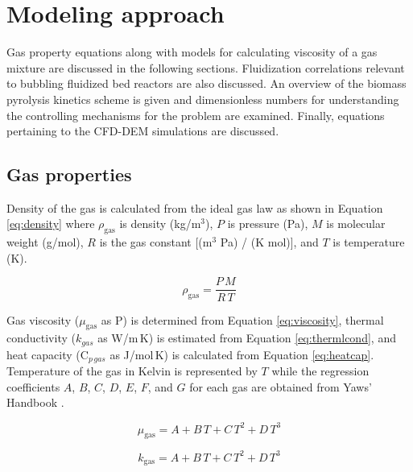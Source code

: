 
\section{Modeling approach}

Gas property equations along with models for calculating viscosity of a gas mixture are discussed in the following sections. Fluidization correlations relevant to bubbling fluidized bed reactors are also discussed. An overview of the biomass pyrolysis kinetics scheme is given and dimensionless numbers for understanding the controlling mechanisms for the problem are examined. Finally, equations pertaining to the CFD-DEM simulations are discussed.


\subsection{Gas properties}

Density of the gas is calculated from the ideal gas law as shown in Equation \ref{eq:density} where $\rho_\text{gas}$ is density (kg/m$^3$), $P$ is pressure (Pa), $M$ is molecular weight (g/mol), $R$ is the gas constant [(m$^3$ Pa) / (K mol)], and $T$ is temperature (K).

\begin{equation}\label{eq:density}
    \rho_\text{gas} = \frac{P\,M}{R\,T}
\end{equation}

Gas viscosity ($\mu_\text{gas}$ as \textmugreek P) is determined from Equation \ref{eq:viscosity}, thermal conductivity ($k_{gas}$ as W/m\,K) is estimated from Equation \ref{eq:thermlcond}, and heat capacity (C$_{p\,gas}$ as J/mol\,K) is calculated from Equation \ref{eq:heatcap}. Temperature of the gas in Kelvin is represented by $T$ while the regression coefficients $A$, $B$, $C$, $D$, $E$, $F$, and $G$ for each gas are obtained from Yaws' Handbook \cite{Yaws2014}.

\begin{equation}\label{eq:viscosity}
    \mu_\text{gas} = A + B\,T + C\,T^2 + D\,T^3
\end{equation}

\begin{equation}\label{eq:thermlcond}
    k_\text{gas} = A + B\,T + C\,T^2 + D\,T^3
\end{equation}

